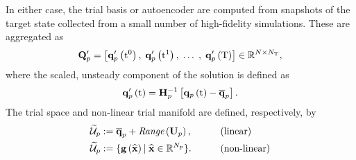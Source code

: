 %
In either case, the trial basis or autoencoder are computed from snapshots of the target state collected from a small number of high-fidelity simulations. These are aggregated as
%
\begin{equation}\label{eq:primSnapMat}
	\primDataMatUns = \left[ \primFuncUns{\initTime}, \; \primFuncUns{\timeVar^1}, \; \hdots \; , \; \primFuncUns{\finalTime} \right] \inRTwo{\numDOF}{\numSnaps},
\end{equation}
%
where the scaled, unsteady component of the solution is defined as
%
\begin{equation}\label{eq:primUns}
	\primFuncUns{\timeVar} = \primScaleInv \left[\primFunc{\timeVar} - \primVecCent\right].
\end{equation}
%
The trial space and non-linear trial manifold are defined, respectively, by
%
\begin{alignat}{2}
    \primTrialSpace &\defEq \primVecCent + \textit{Range}\left(\primTrial\right), \qquad &&\text{(linear)}\\
    \primTrialSpace &\defEq \{\decoderFunc{\nnInputCoef} \vert \; \nnInputCoef \inROne{\numPrimModes} \}. \qquad &&\text{(non-linear)}
\end{alignat}
%

